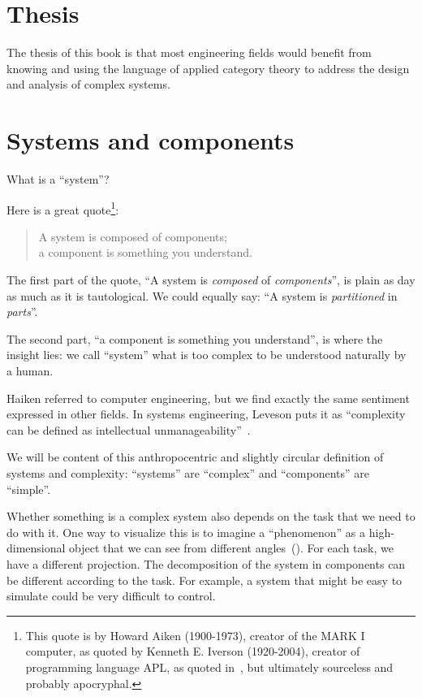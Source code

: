 \section{Thesis}

The thesis of this book is that most engineering fields would benefit
from knowing and using the language of applied category theory to
address the design and analysis of complex systems.


\section{Systems and components}
\label{sec:systems-and-components}

What is a ``system''?

Here is a great quote\footnote{
    This quote is by Howard Aiken (1900-1973), creator of the MARK I computer,
    as quoted by Kenneth E. Iverson (1920-2004), creator of programming language APL,
    as quoted in~\cite{McIntyre1999Role}, but ultimately sourceless and probably apocryphal.
}:

\begin{quote}
    A system is composed of components;  \\
    a component is something you understand.
\end{quote}

The first part of the quote, ``A system is \emph{composed} of \emph{components}'', is plain as day as much as it is tautological. We could equally say: ``A system is \emph{partitioned} in \emph{parts}''.

The second part, ``a component is something you understand'', is where the insight lies: we call ``system'' what is too complex to be understood naturally by a human.

Haiken referred to computer engineering, but we find exactly the same sentiment expressed in other fields. In systems engineering, Leveson puts it as ``complexity can be defined as intellectual unmanageability''~\cite{leveson12engineering}.

We will be content of this anthropocentric and slightly circular definition of systems and
complexity: ``systems'' are ``complex'' and ``components'' are ``simple''.

Whether something is a complex system also depends on the task that we need to do with it. One
way to visualize this is to imagine a ``phenomenon'' as a high-dimensional object that we can see
from different angles~(). For each task, we have a different
projection. The decomposition of the system in components can be different according to the
task. For example, a system that might be easy to simulate could be very difficult to control.

